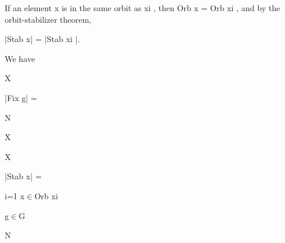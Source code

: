 \documentclass[a4paper,portrait,12pt]{article}
\begin{document}
\begin{flushleft}
If an element x is in the same orbit as xi , then Orb x = Orb xi , and by the orbit-stabilizer theorem,
\end{flushleft}


\begin{flushleft}
|Stab x| = |Stab xi |.
\end{flushleft}


\begin{flushleft}
We have
\end{flushleft}


\begin{flushleft}
X
\end{flushleft}





\begin{flushleft}
|Fix g| =
\end{flushleft}





\begin{flushleft}
N
\end{flushleft}


\begin{flushleft}
X
\end{flushleft}





\begin{flushleft}
X
\end{flushleft}





\begin{flushleft}
|Stab x| =
\end{flushleft}





\begin{flushleft}
i=1 x$\in$Orb xi
\end{flushleft}





\begin{flushleft}
g$\in$G
\end{flushleft}





\begin{flushleft}
N
\end{flushleft}
\end{document}
